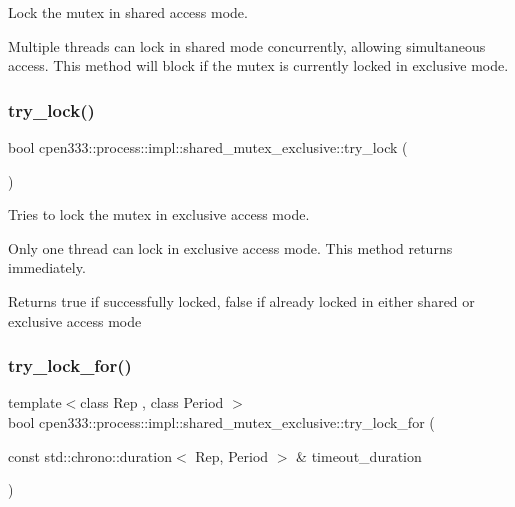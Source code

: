 Lock the mutex in shared access mode. 

Multiple threads can lock in shared mode concurrently, allowing simultaneous access. This method will block if the mutex is currently locked in exclusive mode. \mbox{\label{classcpen333_1_1process_1_1impl_1_1shared__mutex__exclusive_aa7b41d55016b38a9d51f23d8c8468857}} 
\subsubsection{\texorpdfstring{try\+\_\+lock()}{try\_lock()}}
{\footnotesize\ttfamily bool cpen333\+::process\+::impl\+::shared\+\_\+mutex\+\_\+exclusive\+::try\+\_\+lock (\begin{DoxyParamCaption}{ }\end{DoxyParamCaption})\hspace{0.3cm}{\ttfamily [inline]}}



Tries to lock the mutex in exclusive access mode. 

Only one thread can lock in exclusive access mode. This method returns immediately.

\begin{DoxyReturn}{Returns}
true if successfully locked, false if already locked in either shared or exclusive access mode 
\end{DoxyReturn}
\mbox{\label{classcpen333_1_1process_1_1impl_1_1shared__mutex__exclusive_a6f74ff596d66d4ac6b8e7793b8dca78d}} 
\subsubsection{\texorpdfstring{try\+\_\+lock\+\_\+for()}{try\_lock\_for()}}
{\footnotesize\ttfamily template$<$class Rep , class Period $>$ \\
bool cpen333\+::process\+::impl\+::shared\+\_\+mutex\+\_\+exclusive\+::try\+\_\+lock\+\_\+for (\begin{DoxyParamCaption}\item[{const std\+::chrono\+::duration$<$ Rep, Period $>$ \&}]{timeout\+\_\+duration }\end{DoxyParamCaption})\hspace{0.3cm}{\ttfamily [inline]}}



